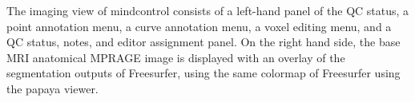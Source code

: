 \label{fig:imagingview}
The imaging view of mindcontrol consists of a left-hand panel of the QC status, a point annotation menu, a curve annotation menu, a voxel editing menu, and a QC status, notes, and editor assignment panel. On the right hand side, the base MRI anatomical MPRAGE image is displayed with an overlay of the segmentation outputs of Freesurfer, using the same colormap of Freesurfer using the papaya viewer. 